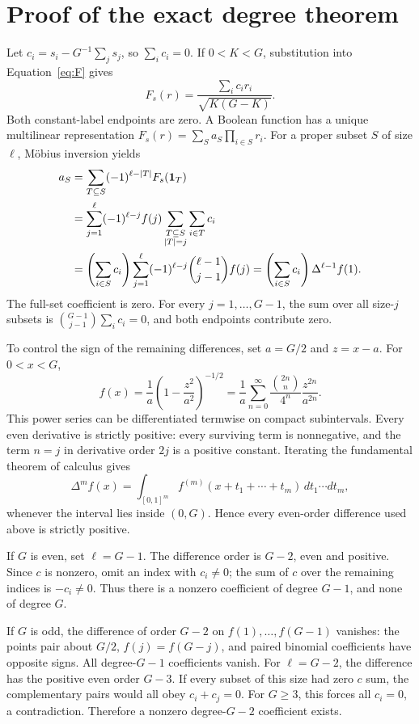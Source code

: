 \section{Proof of the exact degree theorem}\label{app:proof}
Let $c_i=s_i-G^{-1}\sum_j s_j$, so $\sum_i c_i=0$. If $0<K<G$, substitution into Equation~\eqref{eq:F} gives
\[
 F_s(r)=\frac{\sum_i c_i r_i}{\sqrt{K(G-K)}}.
\]
Both constant-label endpoints are zero. A Boolean function has a unique multilinear representation $F_s(r)=\sum_S a_S\prod_{i\in S}r_i$. For a proper subset $S$ of size $\ell$, M\"obius inversion yields
\begin{align*}
 a_S&=\sum_{T\subseteq S}(-1)^{\ell-|T|}F_s(\mathbf 1_T)\\
 &=\sum_{j=1}^{\ell}(-1)^{\ell-j}f(j)
       \sum_{\substack{T\subseteq S\\|T|=j}}\sum_{i\in T}c_i\\
 &=\left(\sum_{i\in S}c_i\right)
       \sum_{j=1}^{\ell}(-1)^{\ell-j}\binom{\ell-1}{j-1}f(j)
 =\left(\sum_{i\in S}c_i\right)\Delta^{\ell-1}f(1).
\end{align*}
The full-set coefficient is zero. For every $j=1,\ldots,G-1$, the sum over all size-$j$ subsets is $\binom{G-1}{j-1}\sum_i c_i=0$, and both endpoints contribute zero.

To control the sign of the remaining differences, set $a=G/2$ and $z=x-a$. For $0<x<G$,
\[
 f(x)=\frac1a\left(1-\frac{z^2}{a^2}\right)^{-1/2}
 =\frac1a\sum_{n=0}^{\infty}\frac{\binom{2n}{n}}{4^n}
   \frac{z^{2n}}{a^{2n}}.
\]
This power series can be differentiated termwise on compact subintervals. Every even derivative is strictly positive: every surviving term is nonnegative, and the term $n=j$ in derivative order $2j$ is a positive constant. Iterating the fundamental theorem of calculus gives
\[
 \Delta^m f(x)=\int_{[0,1]^m} f^{(m)}(x+t_1+\cdots+t_m)\,dt_1\cdots dt_m,
\]
whenever the interval lies inside $(0,G)$. Hence every even-order difference used above is strictly positive.

If $G$ is even, set $\ell=G-1$. The difference order is $G-2$, even and positive. Since $c$ is nonzero, omit an index with $c_i\ne0$; the sum of $c$ over the remaining indices is $-c_i\ne0$. Thus there is a nonzero coefficient of degree $G-1$, and none of degree $G$.

If $G$ is odd, the difference of order $G-2$ on $f(1),\ldots,f(G-1)$ vanishes: the points pair about $G/2$, $f(j)=f(G-j)$, and paired binomial coefficients have opposite signs. All degree-$G-1$ coefficients vanish. For $\ell=G-2$, the difference has the positive even order $G-3$. If every subset of this size had zero $c$ sum, the complementary pairs would all obey $c_i+c_j=0$. For $G\ge3$, this forces all $c_i=0$, a contradiction. Therefore a nonzero degree-$G-2$ coefficient exists.

